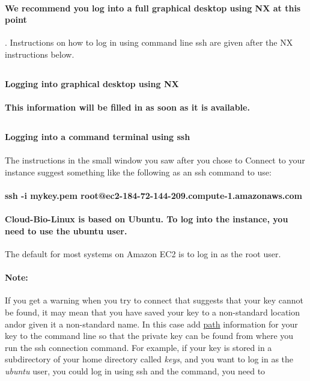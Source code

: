 \paragraph{We recommend you log into a full graphical desktop using NX at this point}. Instructions on how to log in using command line ssh are given after the NX instructions below.

\label{section:nx}
\subsection{}\textbf{Logging into graphical desktop using NX}

\paragraph{This information will be filled in as soon as it is available.}


\subsection{}\textbf{Logging into a command terminal using ssh}

\paragraph{}The instructions in the small window you saw after you chose to Connect to your instance suggest something like the following as an ssh command to use:

\paragraph{ssh -i mykey.pem root@ec2-184-72-144-209.compute-1.amazonaws.com}

\paragraph{Cloud-Bio-Linux is based on Ubuntu. To log into the instance, you need to \textbf{use the ubuntu user}.} The default for most systems on Amazon EC2 is to log in as the root user. 


\paragraph{Note:} If you get a warning when you try to connect that suggests that your key cannot be found, it may mean that you have saved your key to a non-standard location and\/or given it a non-standard name. In this case add \href{http://nebc.nerc.ac.uk/tools/bio-linux/bio-linux-faq\#path}{path} information for your key to the command line so that the private key can be found from where you run the ssh connection command. For example, if your key is stored in a subdirectory of your home directory called \emph{keys}, and you want to log in as the \emph{ubuntu} user, you could log in using ssh and the command, you need to

